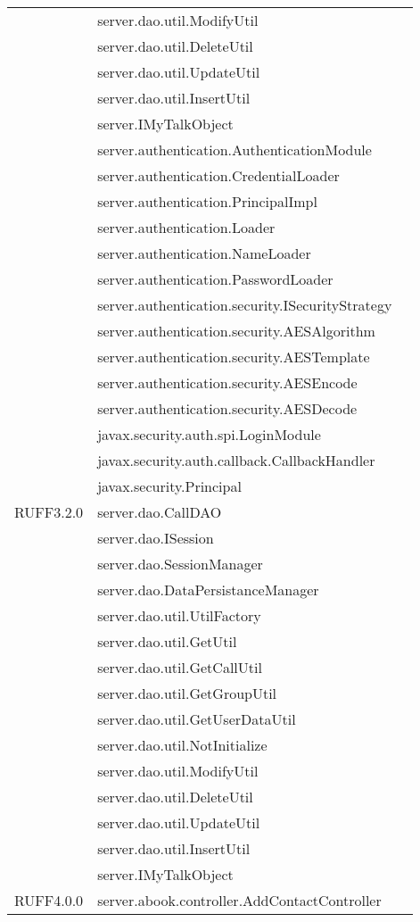 \begin{center}
\begin{longtable}{lp{}l}
& server.dao.util.ModifyUtil\\
& server.dao.util.DeleteUtil\\
& server.dao.util.UpdateUtil\\
& server.dao.util.InsertUtil\\
& server.IMyTalkObject\\
& server.authentication.AuthenticationModule\\
& server.authentication.CredentialLoader\\
& server.authentication.PrincipalImpl\\
& server.authentication.Loader\\
& server.authentication.NameLoader\\
& server.authentication.PasswordLoader\\
& server.authentication.security.ISecurityStrategy\\
& server.authentication.security.AESAlgorithm\\
& server.authentication.security.AESTemplate\\
& server.authentication.security.AESEncode\\
& server.authentication.security.AESDecode\\
& javax.security.auth.spi.LoginModule\\
& javax.security.auth.callback.CallbackHandler\\
& javax.security.Principal\\
RUFF3.2.0 & server.dao.CallDAO\\
& server.dao.ISession\\
& server.dao.SessionManager\\
& server.dao.DataPersistanceManager\\
& server.dao.util.UtilFactory\\
& server.dao.util.GetUtil\\
& server.dao.util.GetCallUtil\\
& server.dao.util.GetGroupUtil\\
& server.dao.util.GetUserDataUtil\\
& server.dao.util.NotInitialize\\
& server.dao.util.ModifyUtil\\
& server.dao.util.DeleteUtil\\
& server.dao.util.UpdateUtil\\
& server.dao.util.InsertUtil\\
& server.IMyTalkObject\\
RUFF4.0.0 & server.abook.controller.AddContactController\\

\end{longtable}
\end{center}
